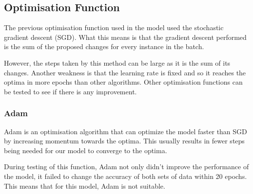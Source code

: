 \documentclass[../main.tex]{subfiles}
\begin{document}
\subsection{Optimisation Function}

The previous optimisation function used in the model used the stochastic gradient descent (SGD). What this means is that the gradient descent performed is the sum of the proposed changes for every instance in the batch. 

However, the steps taken by this method can be large as it is the sum of its changes. Another weakness is that the learning rate is fixed and so it reaches the optima in more epochs than other algorithms. Other optimisation functions can be tested to see if there is any improvement. 

\subsubsection{Adam}
Adam is an optimisation algorithm that can optimize the model faster than SGD by increasing momentum towards the optima. This usually results in fewer steps being needed for our model to converge to the optima. 

During testing of this function, Adam not only didn't improve the performance of the model, it failed to change the accuracy of both sets of data within 20 epochs. This means that for this model, Adam is not suitable. 
\end{document}
